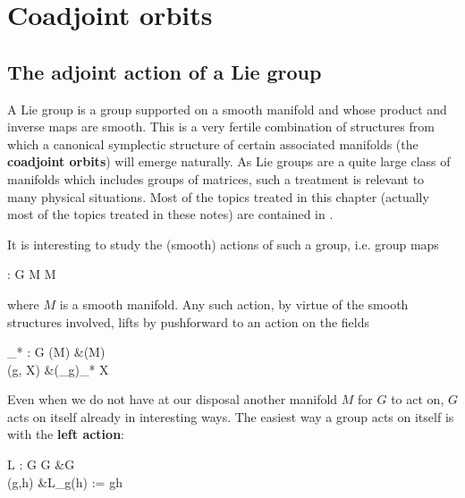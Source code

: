 \documentclass[main.tex]{subfiles}
\begin{document}
\chapter{Coadjoint orbits}
\section{The adjoint action of a Lie group}
A Lie group is a group supported on a smooth manifold and whose product and inverse maps are smooth. This is a very fertile combination of structures from which a canonical symplectic structure of certain associated manifolds (the \textbf{coadjoint orbits}) will emerge naturally. As Lie groups are a quite large class of manifolds which includes groups of matrices, such a treatment is relevant to many physical situations. Most of the topics treated in this chapter (actually most of the topics treated in these notes) are contained in \cite{michor2008}.

It is interesting to study the (smooth) actions of such a group, i.e. group maps
\begin{eqalign}
	\rho : G \times M \longto M
\end{eqalign}
where $M$ is a smooth manifold. Any such action, by virtue of the smooth structures involved, lifts by pushforward to an action on the fields
\begin{eqalign}
	\rho_* : G \times \fields(M) &\longto \fields(M)\\
		(g, X) &\longmapsto (\rho_g)_* X
\end{eqalign}

Even when we do not have at our disposal another manifold $M$ for $G$ to act on, $G$ acts on itself already in interesting ways. The easiest way a group acts on itself is with the \textbf{left action}:
\begin{eqalign}
	L : G \times G &\longto G\\
	(g,h) &\longmapsto L_g(h) := gh
\end{eqalign}
\end{document}
